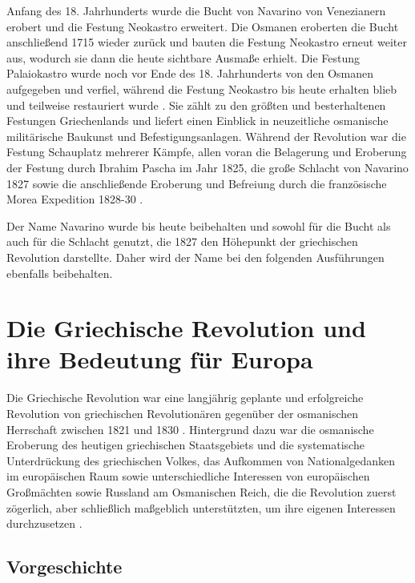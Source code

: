 \documentclass[preprint]{geomorphica} %
\begin{document}
Anfang des 18. Jahrhunderts wurde die Bucht von Navarino von Venezianern erobert und die Festung Neokastro erweitert.
Die Osmanen eroberten die Bucht anschließend 1715 wieder zurück und bauten die Festung Neokastro erneut weiter aus, wodurch sie dann die heute sichtbare Ausmaße erhielt.
Die Festung Palaiokastro wurde noch vor Ende des 18. Jahrhunderts von den Osmanen aufgegeben und verfiel, während die Festung Neokastro bis heute erhalten blieb und teilweise restauriert wurde \cite{Davis2008}.
Sie zählt zu den größten und besterhaltenen Festungen Griechenlands und liefert einen Einblick in neuzeitliche osmanische militärische Baukunst und Befestigungsanlagen.
Während der Revolution war die Festung Schauplatz mehrerer Kämpfe, allen voran die Belagerung und Eroberung der Festung durch Ibrahim Pascha im Jahr 1825, die große Schlacht von Navarino 1827 sowie die anschließende Eroberung und Befreiung durch die französische Morea Expedition 1828-30 \cite{Brewer2001}.

Der Name Navarino wurde bis heute beibehalten und sowohl für die Bucht als auch für die Schlacht genutzt, die 1827 den Höhepunkt der griechischen Revolution darstellte.
Daher wird der Name bei den folgenden Ausführungen ebenfalls beibehalten.


\section{Die Griechische Revolution und ihre Bedeutung für Europa}

Die Griechische Revolution war eine langjährig geplante und erfolgreiche Revolution von griechischen Revolutionären gegenüber der osmanischen Herrschaft zwischen 1821 und 1830 \cite{CarledgeVarnava2022}. 
Hintergrund dazu war die osmanische Eroberung des heutigen griechischen Staatsgebiets und die systematische Unterdrückung des griechischen Volkes, das Aufkommen von Nationalgedanken im europäischen Raum sowie unterschiedliche Interessen von europäischen Großmächten sowie Russland am Osmanischen Reich, die die Revolution zuerst zögerlich, aber schließlich maßgeblich unterstützten, um ihre eigenen Interessen durchzusetzen \cite{Zelepos2015, Dakin1952}.

\subsection{Vorgeschichte}
\end{document}
